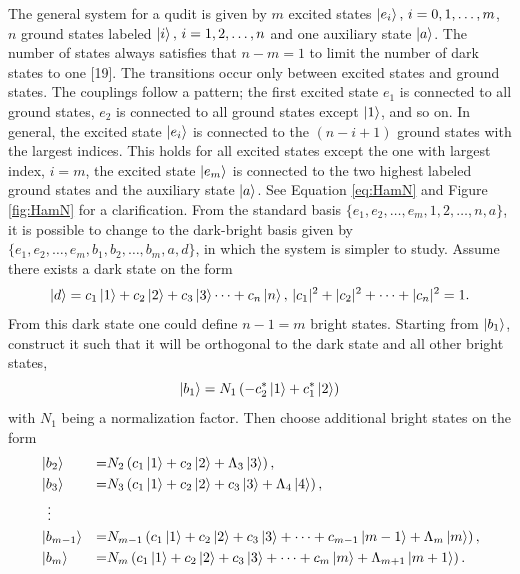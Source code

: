The general system for a qudit is given by $m$ excited states $\ket{e_i},\,i = 0,1,\dots,m$, $n$ ground states labeled $\ket{i},\,i = 1,2,\dots,n$ and one auxiliary state $\ket{a}$. The number of states always satisfies that $n-m = 1$ to limit the number of dark states to one [19].
The transitions occur only between excited states and ground states. The couplings follow a pattern; the first excited state $e_1$ is connected to all ground states, $e_2$ is connected to all ground states except $\ket{1}$, and so on. In general, the excited state $\ket{e_i}$ is connected to the $(n - i + 1)$ ground states with the largest indices. This holds for all excited states except the one with largest index, $i = m$, the excited state $\ket{e_m}$ is connected to the two highest labeled ground states and the auxiliary state $\ket{a}$. See Equation \ref{eq:HamN} and Figure \ref{fig:HamN} for a clarification. 
From the standard basis $\{e_1,e_2,\dots,e_m,1,2,\dots,n,a\}$, it is possible to change to the dark-bright basis given by $\{e_1,e_2,\dots,e_m,b_1,b_2,\dots,b_{m},a,d\}$, in which the system is simpler to study. Assume there exists a dark state on the form 
\begin{equation}
\ket{d} = c_1\ket{1} + c_2\ket{2} + c_3\ket{3} \dots + c_{n}\ket{n},\, |c_1|^2 + |c_2|^2 + \dots + |c_{n}|^2 = 1.
\end{equation}
From this dark state one could define $n-1 = m$ bright states. Starting from $\ket{b_1}$, construct it such that it will be orthogonal to the dark state and all other bright states,
\begin{equation}
\ket{b_1} = N_1\left(-c_2^{*}\ket{1} + c_1^{*}\ket{2}\right)
\end{equation}
with $N_1$ being a normalization factor. Then choose additional bright states on the form
\begin{equation}
\label{eq:birght_states}
\begin{aligned}
&\ket{b_2} &=& N_2 \left(c_1\ket{1} + c_2\ket{2} + \Lambda_3\ket{3}  \right),
\\
&\ket{b_3} &=&  N_3 \left(c_1\ket{1} + c_2\ket{2} + c_3\ket{3} + \Lambda_{4}\ket{4} \right),
\\
&\;\;\vdots
\\
&\ket{b_{m-1}} &=& N_{m-1} \left( c_1\ket{1} + c_2\ket{2} + c_3\ket{3}  + \dots + c_{m-1}\ket{m-1}+ \Lambda_m\ket{m} \right),
\\
&\ket{b_{m}} &=& N_m \left( c_1\ket{1} + c_2\ket{2} + c_3\ket{3}  + \dots + c_m\ket{m} + \Lambda_{m+1}\ket{m+1} \right).
\end{aligned}
\end{equation}
